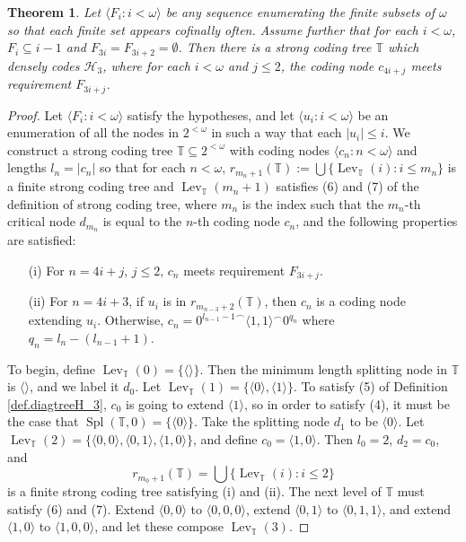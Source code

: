 \documentclass{amsart}
\newtheorem{thm}{Theorem}[section]
\theoremstyle{remark}
\theoremstyle{definition}
\theoremstyle{remark}
\newcommand{\om}{\omega}
\newcommand{\sse}{\subseteq}
\DeclareMathOperator{\Spl}{Spl}
\DeclareMathOperator{\Lev}{Lev}
\newcommand{\bT}{\mathbb{T}}
\newcommand{\lgl}{\langle}
\newcommand{\rgl}{\rangle}
\begin{document}
\begin{thm}\label{thm.cool}
Let  $\lgl F_i:i<\om\rgl$  be any sequence enumerating  the finite subsets of $\om$ so that each finite set appears cofinally often.
Assume further that
for each $i<\om$,
 $F_i\sse  i-1$ and $F_{3i}=F_{3i+2}=\emptyset$.
Then there is a strong coding  tree $\bT$ which densely codes $\mathcal{H}_3$, where for each $i<\om$ and $j\le 2$, the coding node $c_{4i+j}$ meets requirement $F_{3i+j}$.
\end{thm}


\begin{proof}
Let  $\lgl F_i:i<\om\rgl$  satisfy the hypotheses, and
let $\lgl u_i: i<\om\rgl$ be an enumeration of all the nodes in $2^{<\om}$   in such a way that each  $|u_i|\le i$.
We  construct  a strong coding tree $\bT\sse 2^{<\om}$ with coding nodes $\lgl c_n:n<\om\rgl$  and lengths $l_n=|c_n|$
so that for each $n<\om$,
$r_{m_n+1}(\bT):=\bigcup\{\Lev_{\bT}(i):i\le m_ n\}$  is a finite strong coding tree
and $\Lev_{\bT}(m_n+1)$ satisfies (6) and (7) of the definition of strong coding tree,
where $m_n$ is the index such that the $m_n$-th critical node $d_{m_n}$ is equal to the $n$-th coding node $c_n$,
and the following properties are satisfied:



\begin{enumerate}
\item[(i)]
For $n=4i+j$,  $j\le 2$,  $c_{n}$ meets requirement $F_{3i+j}$.
\item[(ii)]
For $n=4i+3$, if $u_i$ is in
$r_{m_{n-3}+2}(\bT)$,
then $c_n$ is a coding node extending $u_i$.
Otherwise,
 $c_n={0^{l_{n-1}-1}}^{\frown}\lgl 1,1\rgl ^{\frown}{0^{q_n}}$
where $q_n=l_n-(l_{n-1}+1)$.
\end{enumerate}



To begin, define $\Lev_{\bT}(0)=\{\lgl\rgl\}$.
Then the minimum length splitting node in $\bT$ is $\lgl \rgl$, and we label it $d_0$.
Let $\Lev_{\bT}(1)=\{\lgl 0\rgl,\lgl 1\rgl\}$.
To satisfy  (5) of Definition \ref{def.diagtreeH_3},
 $c_0$ is going  to extend $\lgl 1\rgl$,
so  in order to satisfy (4), it must be the case that  $\Spl(\bT,0)=\{\lgl 0\rgl\}$.
Take the splitting node $d_1$ to be  $\lgl 0\rgl$.
Let  $\Lev_{\bT}(2)=\{\lgl 0,0\rgl,\lgl 0,1\rgl, \lgl 1,0\rgl\}$, and
define  $c_0=\lgl 1,0\rgl$.
Then  $l_0=2$,  $d_2=c_0$,
 and
\begin{equation}
r_{m_0+1}(\bT)=\bigcup\{\Lev_{\bT}(i):i\le 2\}
\end{equation}
is a finite strong coding tree satisfying (i) and (ii).
The  next level of $\bT$ must  satisfy
(6) and (7).
Extend
$\lgl 0,0\rgl$  to $\lgl 0,0,0\rgl$,  extend $\lgl 0,1\rgl$  to $\lgl 0,1,1\rgl$, and
extend $\lgl 1,0\rgl$ to $\lgl 1,0,0\rgl$, and let these compose $\Lev_{\bT}(3)$.






\end{proof}
\end{document}
